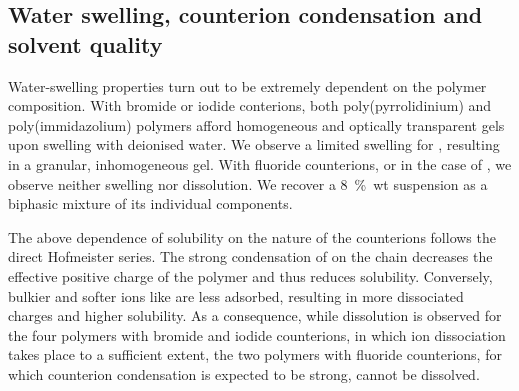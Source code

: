 \documentclass[twoside,twocolumn,9pt]{article}
\begin{document}
\subsection{Water swelling, counterion condensation and solvent quality}
Water-swelling properties turn out to be extremely dependent on the polymer composition. With bromide or iodide conterions, both poly(pyrrolidinium) and poly(immidazolium) polymers afford homogeneous and optically transparent gels upon swelling with deionised water. We observe a limited swelling for , resulting in a granular, inhomogeneous gel. With fluoride counterions, or in the case of , we observe neither swelling nor dissolution. We recover a 8~\%~wt suspension as a biphasic mixture of its individual components.

The above dependence of solubility on the nature of the counterions follows the direct Hofmeister series. The strong condensation of  on the chain decreases the effective positive charge of the polymer and thus reduces solubility. Conversely, bulkier and softer ions like  are less adsorbed, resulting in more dissociated charges and higher solubility. As a consequence, while dissolution is observed for the four polymers with bromide and iodide counterions, in which ion dissociation takes place to a sufficient extent, the two polymers with fluoride counterions, for which counterion condensation is expected to be strong, cannot be dissolved.
\end{document}
